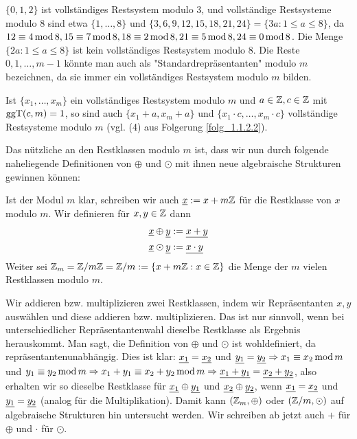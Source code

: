 \begin{bsp}
	$\{0,1,2\}$ ist vollständiges Restsystem modulo $3$, und vollständige Restsysteme modulo $8$ sind etwa $\{1,\dots,8\}$ und $\{3,6,9,12,15,18,21,24\} = \{3a : 1 \leq a \leq 8\}$, da $12 \equiv 4 \operatorname{mod} 8, 15 \equiv 7 \operatorname{mod} 8, 18 \equiv 2 \operatorname{mod} 8, 21 \equiv 5 \operatorname{mod} 8, 24 \equiv 0 \operatorname{mod} 8$. Die Menge $\{2a : 1 \leq a \leq 8\}$ ist kein vollständiges Restsystem modulo $8$. Die Reste $0,1,\dots,m-1$ könnte man auch als "Standardrepräsentanten" modulo $m$ bezeichnen, da sie immer ein vollständiges Restsystem modulo $m$ bilden.
\end{bsp}

\begin{folg}
	Ist $\{x_1,\dots,x_m\}$ ein vollständiges Restsystem modulo $m$ und $a \in \mathbb{Z},  c\in \mathbb{Z}$ mit $\operatorname{ggT}(c,m) = 1$, so sind auch $\{x_1 + a, x_m + a\}$ und $\{x_1 \cdot c, \dots, x_m \cdot c\}$ vollständige Restsysteme modulo $m$ (vgl. (4) aus Folgerung \ref{folg_1.1.2.2}).
\end{folg}

Das nützliche an den Restklassen modulo $m$ ist, dass wir nun durch folgende naheliegende Definitionen von $\oplus$ und $\odot$ mit ihnen neue algebraische Strukturen gewinnen können:
\begin{defn}
	Ist der Modul $m$ klar, schreiben wir auch $\uline{x} := x+m\ZZ$ für die Restklasse von $x$ modulo $m$. Wir definieren für $x,y \in \mathbb{Z}$ dann
	\begin{equation}
	\begin{aligned}
		\uline{x} \oplus \uline{y} &:= \uline{x+y} \\
		\uline{x} \odot \uline{y} &:= \uline{x \cdot y}
	\end{aligned}
	\end{equation}
	Weiter sei $\mathbb{Z}_m = \mathbb{Z}/m\mathbb{Z} = \mathbb{Z}/m := \{x + m\mathbb{Z} : x \in \mathbb{Z}\}$ die Menge der $m$ vielen Restklassen modulo $m$.
\end{defn}

\begin{folg}
	Wir addieren bzw. multiplizieren zwei Restklassen, indem wir Repräsentanten $x,y$ auswählen und diese addieren bzw. multiplizieren. Das ist nur sinnvoll, wenn bei unterschiedlicher Repräsentantenwahl dieselbe Restklasse als Ergebnis herauskommt. Man sagt, die Definition von $\oplus$ und $\odot$ ist wohldefiniert, da repräsentantenunabhängig. Dies ist klar: $\uline{x_1} = \uline{x_2}$ und $\uline{y_1} = \uline{y_2} \Rightarrow x_1 \kon x_2 \modu m$ und $y_1 \kon y_2 \modu m \Rightarrow x_1 + y_1 \kon x_2 +y_2 \modu m \Rightarrow \uline{x_1+y_1} = \uline{x_2 + y_2}$, also erhalten wir so dieselbe Restklasse für $\uline{x_1} \oplus \uline{y_1}$ und $\uline{x_2} \oplus \uline{y_2}$, wenn $\uline{x_1} = \uline{x_2}$ und $\uline{y_1} = \uline{y_2}$ (analog für die Multiplikation). Damit kann $(\mathbb{Z}_m,\oplus)$ oder $(\mathbb{Z}/m,\odot)$ auf algebraische Strukturen hin untersucht werden. Wir schreiben ab jetzt auch $+$ für $\oplus$ und $\cdot$ für $\odot$.
\end{folg}

